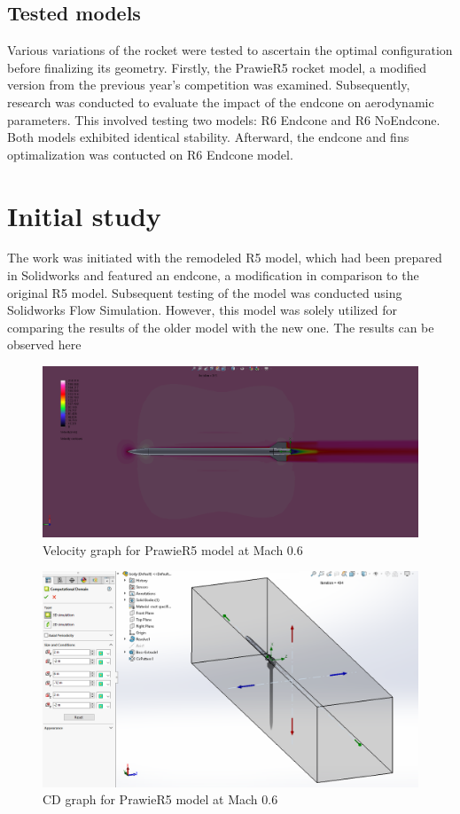\documentclass{article}
\begin{document}
\subsection{Tested models}
Various variations of the rocket were tested to ascertain the optimal configuration before 
finalizing its geometry. Firstly, the PrawieR5 rocket model, a modified version from the previous year's competition 
was examined. Subsequently, research was conducted to evaluate the impact of the endcone on 
aerodynamic parameters. This involved testing two models: R6 Endcone and R6 NoEndcone. Both models exhibited identical stability. Afterward, the endcone and fins optimalization
was contucted on R6 Endcone model.


\newpage
\section{Initial study}
The work was initiated with the remodeled R5 model, which had been prepared in Solidworks 
and featured an endcone, a modification in comparison to the original R5 model. Subsequent 
testing of the model was conducted using Solidworks Flow Simulation. However, this model 
was solely utilized for comparing the results of the older model with the new one. The 
results can be observed here

\begin{figure}[H]
    \centering
    \includegraphics[width=\textwidth]{../data/PrawieR5-Solid/PrawieR5-TR-Velocity-Mach06.png}
    \caption{Velocity graph for PrawieR5 model at Mach 0.6}
\end{figure}

\begin{figure}[H]
    \centering
    \includegraphics[width=\textwidth]{../data/PrawieR5-Solid/ComputationalDomain.png}
    \caption{CD graph for PrawieR5 model at Mach 0.6}
\end{figure}
\end{document}
